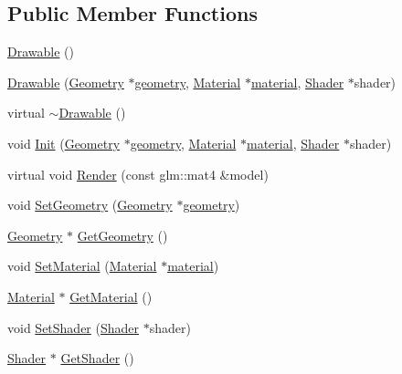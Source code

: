 \subsection*{Public Member Functions}
\begin{DoxyCompactItemize}
\item 
\mbox{\hyperlink{classec_1_1_drawable_adb3c4e7b4d3d510489a26b3d1a8094a2}{Drawable}} ()
\item 
\mbox{\hyperlink{classec_1_1_drawable_a0155615048b762f6d0db09ef93bf604a}{Drawable}} (\mbox{\hyperlink{classec_1_1_geometry}{Geometry}} $\ast$\mbox{\hyperlink{namespaceec_ae4420ccd0f79418a5ce075e43909289faed7daeb157cd9b31e53896ad3c771a26}{geometry}}, \mbox{\hyperlink{classec_1_1_material}{Material}} $\ast$\mbox{\hyperlink{namespaceec_ae4420ccd0f79418a5ce075e43909289faeec34d804c9ce6c89cff596be555e6a4}{material}}, \mbox{\hyperlink{classec_1_1_shader}{Shader}} $\ast$shader)
\item 
virtual \mbox{\hyperlink{classec_1_1_drawable_a4a82e5cd6d6a47ad86ed42cfdda512d8}{$\sim$\+Drawable}} ()
\item 
void \mbox{\hyperlink{classec_1_1_drawable_af3eb193272fc43aedc9aba5104695061}{Init}} (\mbox{\hyperlink{classec_1_1_geometry}{Geometry}} $\ast$\mbox{\hyperlink{namespaceec_ae4420ccd0f79418a5ce075e43909289faed7daeb157cd9b31e53896ad3c771a26}{geometry}}, \mbox{\hyperlink{classec_1_1_material}{Material}} $\ast$\mbox{\hyperlink{namespaceec_ae4420ccd0f79418a5ce075e43909289faeec34d804c9ce6c89cff596be555e6a4}{material}}, \mbox{\hyperlink{classec_1_1_shader}{Shader}} $\ast$shader)
\item 
virtual void \mbox{\hyperlink{classec_1_1_drawable_a596e416058e038df99a57f30724f6d38}{Render}} (const glm\+::mat4 \&model)
\item 
void \mbox{\hyperlink{classec_1_1_drawable_a27f372e03e7cd5fb5e69316aee8c7e6b}{Set\+Geometry}} (\mbox{\hyperlink{classec_1_1_geometry}{Geometry}} $\ast$\mbox{\hyperlink{namespaceec_ae4420ccd0f79418a5ce075e43909289faed7daeb157cd9b31e53896ad3c771a26}{geometry}})
\item 
\mbox{\hyperlink{classec_1_1_geometry}{Geometry}} $\ast$ \mbox{\hyperlink{classec_1_1_drawable_a11e5daa0212c2bba05cb52239154d3e4}{Get\+Geometry}} ()
\item 
void \mbox{\hyperlink{classec_1_1_drawable_aa8ba7c6c76055a776a9e205684c3fa0e}{Set\+Material}} (\mbox{\hyperlink{classec_1_1_material}{Material}} $\ast$\mbox{\hyperlink{namespaceec_ae4420ccd0f79418a5ce075e43909289faeec34d804c9ce6c89cff596be555e6a4}{material}})
\item 
\mbox{\hyperlink{classec_1_1_material}{Material}} $\ast$ \mbox{\hyperlink{classec_1_1_drawable_ab8126a86667e7c8212c93885ab8e64ff}{Get\+Material}} ()
\item 
void \mbox{\hyperlink{classec_1_1_drawable_adad2ef8dba9e5dbe257344f3dc9e2dec}{Set\+Shader}} (\mbox{\hyperlink{classec_1_1_shader}{Shader}} $\ast$shader)
\item 
\mbox{\hyperlink{classec_1_1_shader}{Shader}} $\ast$ \mbox{\hyperlink{classec_1_1_drawable_a282c277d2dc8200b4fe2b79e3d5bc3a8}{Get\+Shader}} ()
\end{DoxyCompactItemize}
